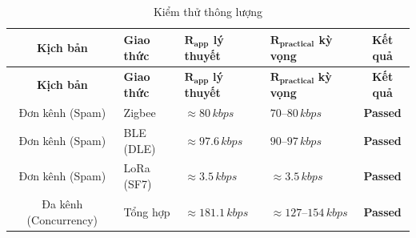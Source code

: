         \begin{longtable}{|c|p{2.5cm}|p{3cm}|p{3.5cm}|c|}
            \caption{Kiểm thử thông lượng}
            \label{tab:test_throughput} \\
            \hline
            \textbf{Kịch bản} & \textbf{Giao thức} & $\boldsymbol{R_{app}}$ \textbf{lý thuyết} & $\boldsymbol{R_{practical}}$ \textbf{kỳ vọng} & \textbf{Kết quả} \\ \hline
            \endfirsthead
            \hline
            \textbf{Kịch bản} & \textbf{Giao thức} & $\boldsymbol{R_{app}}$ \textbf{lý thuyết} & $\boldsymbol{R_{practical}}$ \textbf{kỳ vọng} & \textbf{Kết quả} \\ \hline
            \endhead
            \hline
            \endfoot
            \endlastfoot
        
            Đơn kênh (Spam) & Zigbee & $\approx 80\,kbps$ & $70$--$80\,kbps$ & \textcolor{modern_blue}{\textbf{Passed}} \\ \hline
            Đơn kênh (Spam) & BLE (DLE) & $\approx 97.6\,kbps$ & $90$--$97\,kbps$ & \textcolor{modern_blue}{\textbf{Passed}} \\ \hline
            Đơn kênh (Spam) & LoRa (SF7) & $\approx 3.5\,kbps$ & $\approx 3.5\,kbps$ & \textcolor{modern_blue}{\textbf{Passed}} \\ \hline
            Đa kênh (Concurrency) & Tổng hợp & $\approx 181.1\,kbps$ & $\approx 127$--$154\,kbps$ & \textcolor{modern_blue}{\textbf{Passed}} \\ \hline
        \end{longtable}

            
